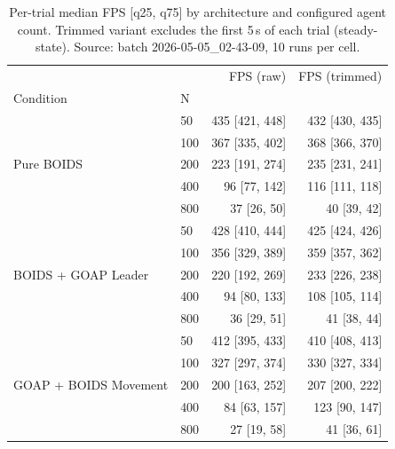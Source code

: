 \begin{table}[htbp]
  \centering
  \caption{Per-trial median FPS [q25, q75] by architecture and configured agent count. Trimmed variant excludes the first 5\,s of each trial (steady-state). Source: batch 2026-05-05_02-43-09, 10 runs per cell.}
  \label{tab:fps-by-architecture}
\begin{tabular}{llrr}
\toprule
 &  & FPS (raw) & FPS (trimmed) \\
Condition & N &  &  \\
\midrule
\multirow[t]{5}{*}{Pure BOIDS} & 50 & 435 [421, 448] & 432 [430, 435] \\
 & 100 & 367 [335, 402] & 368 [366, 370] \\
 & 200 & 223 [191, 274] & 235 [231, 241] \\
 & 400 & 96 [77, 142] & 116 [111, 118] \\
 & 800 & 37 [26, 50] & 40 [39, 42] \\
\cline{1-4}
\multirow[t]{5}{*}{BOIDS + GOAP Leader} & 50 & 428 [410, 444] & 425 [424, 426] \\
 & 100 & 356 [329, 389] & 359 [357, 362] \\
 & 200 & 220 [192, 269] & 233 [226, 238] \\
 & 400 & 94 [80, 133] & 108 [105, 114] \\
 & 800 & 36 [29, 51] & 41 [38, 44] \\
\cline{1-4}
\multirow[t]{5}{*}{GOAP + BOIDS Movement} & 50 & 412 [395, 433] & 410 [408, 413] \\
 & 100 & 327 [297, 374] & 330 [327, 334] \\
 & 200 & 200 [163, 252] & 207 [200, 222] \\
 & 400 & 84 [63, 157] & 123 [90, 147] \\
 & 800 & 27 [19, 58] & 41 [36, 61] \\
\cline{1-4}
\bottomrule
\end{tabular}
\end{table}
